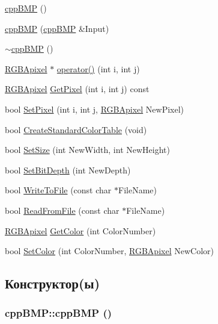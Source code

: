 \begin{CompactItemize}
\item 
\hyperlink{classcpp_b_m_p_dd999f78c5b629a718c9ff82dca1b64a}{cppBMP} ()
\item 
\hyperlink{classcpp_b_m_p_97909a5d65342669eb673dc264600058}{cppBMP} (\hyperlink{classcpp_b_m_p}{cppBMP} \&Input)
\item 
\hyperlink{classcpp_b_m_p_ea62579b6a8a25449e108121de524019}{$\sim$cppBMP} ()
\item 
\hyperlink{struct_r_g_b_apixel}{RGBApixel} $\ast$ \hyperlink{classcpp_b_m_p_02a494f74cfc7d319e6ea9c1ab70c672}{operator()} (int i, int j)
\item 
\hyperlink{struct_r_g_b_apixel}{RGBApixel} \hyperlink{classcpp_b_m_p_230d6694feababb803a9b4cdd4885d4d}{GetPixel} (int i, int j) const 
\item 
bool \hyperlink{classcpp_b_m_p_3d02d63c0abf0c87bb3698b26ac78dae}{SetPixel} (int i, int j, \hyperlink{struct_r_g_b_apixel}{RGBApixel} NewPixel)
\item 
bool \hyperlink{classcpp_b_m_p_2784c5b22510793c4f33bb9f566de4a7}{CreateStandardColorTable} (void)
\item 
bool \hyperlink{classcpp_b_m_p_9a6372827cbeb056c76f418bf764455d}{SetSize} (int NewWidth, int NewHeight)
\item 
bool \hyperlink{classcpp_b_m_p_4929652b47f073d3519b07fc05ed9eab}{SetBitDepth} (int NewDepth)
\item 
bool \hyperlink{classcpp_b_m_p_bee4a161c6d3ad3d627b70b62735259d}{WriteToFile} (const char $\ast$FileName)
\item 
bool \hyperlink{classcpp_b_m_p_b6b3269e3dc09cc5a9650578d5f5aa45}{ReadFromFile} (const char $\ast$FileName)
\item 
\hyperlink{struct_r_g_b_apixel}{RGBApixel} \hyperlink{classcpp_b_m_p_fa347d92080c6aa4870eb4b076d1aeba}{GetColor} (int ColorNumber)
\item 
bool \hyperlink{classcpp_b_m_p_954ee0b08e8b0e9455fe5c4a9e7a7181}{SetColor} (int ColorNumber, \hyperlink{struct_r_g_b_apixel}{RGBApixel} NewColor)
\end{CompactItemize}


\subsection{Конструктор(ы)}
\hypertarget{classcpp_b_m_p_dd999f78c5b629a718c9ff82dca1b64a}{
\subsubsection[{cppBMP}]{\setlength{\rightskip}{0pt plus 5cm}cppBMP::cppBMP ()}}
\label{classcpp_b_m_p_dd999f78c5b629a718c9ff82dca1b64a}


